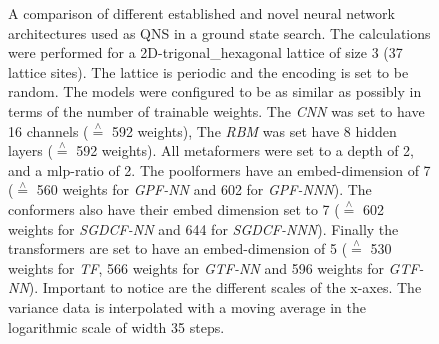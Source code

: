 

\begin{figure}[htbp]
    \centering
    \caption{A comparison of different established and novel neural network architectures used as QNS in a ground state search.
        The calculations were performed for a 2D-trigonal\_hexagonal lattice of size 3 (37 lattice sites).
        The lattice is periodic and the encoding is set to be random.
        The models were configured to be as similar as possibly in terms of the number of trainable weights.
        The \emph{CNN} was set to have 16 channels ($\stackrel{\wedge}{=}$ 592 weights), The \emph{RBM} was set have 8 hidden layers ($\stackrel{\wedge}{=}$ 592 weights). 
        All metaformers were set to a depth of 2, and a mlp-ratio of 2.
        The poolformers have an embed-dimension of 7 ($\stackrel{\wedge}{=}$ 560 weights for \emph{GPF-NN} and 602 for \emph{GPF-NNN}).
        The conformers also have their embed dimension set to 7 ($\stackrel{\wedge}{=}$ 602 weights for \emph{SGDCF-NN} and 644 for \emph{SGDCF-NNN}).
        Finally the transformers are set to have an embed-dimension of 5 ($\stackrel{\wedge}{=}$ 530 weights for \emph{TF}, 566 weights for \emph{GTF-NN} and 596 weights for \emph{GTF-NN}). 
        Important to notice are the different scales of the x-axes. 
        The variance data is interpolated with a moving average in the logarithmic scale of width 35 steps.
    }
    \label{fig:gss-architectures-comp}
\end{figure}